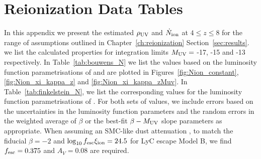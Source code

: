 \chapter{Reionization Data Tables}\label{app:tables}
In this appendix we present the estimated $\rho_{\rm{UV}}$ and $\dot{N}_{\rm{ion}}$ at $4 \leq z \leq 8$ for the range of assumptions outlined in Chapter~\ref{ch:reionization} Section~\ref{sec:results}.  we list the calculated properties for integration limits $M_{\rm{UV}} =$ -17, -15 and -13 respectively. In Table~\ref{tab:bouwens_N} we list the values based on the luminosity function parametrisations of \citet{Bouwens:2014tx} and are plotted in Figures~\ref{fig:Nion_constant}, \ref{fig:Nion_xi_kappa_z} and \ref{fig:Nion_xi_kappa_zMuv}. In Table~\ref{tab:finkelstein_N}, we list the corresponding values for the luminosity function parametrisations of \citep{Finkelstein:2014ub}.
For both sets of values, we include errors based on the uncertainties in the luminosity function parameters and the random errors in the weighted average of $\beta$ or the best-fit $\beta-M_{\rm{UV}}$ slope parameters \citep{Bouwens:2013vf} as appropriate. When assuming an SMC-like dust attenuation \citep{Pei:1992ey}, to match the fiducial $\beta = -2$ and $\log_{10}f_{\rm{esc}} \xi_{\rm{ion}}=24.5$ for LyC escape Model B, we find $f_{\rm{esc}} = 0.375$ and $A_{V} = 0.08$ are required. 

